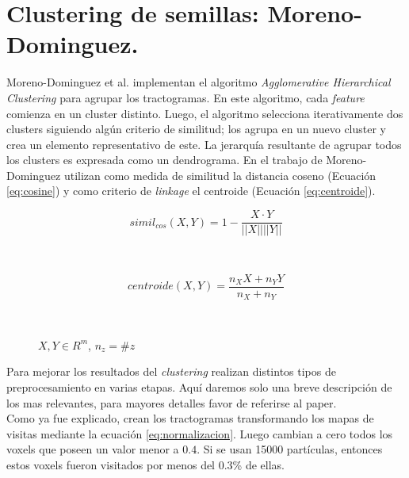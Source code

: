 \section{Clustering de semillas: Moreno-Dominguez.}

Moreno-Dominguez et al. \cite{Moreno-Dominguez2014} implementan el algoritmo
\textit{Agglomerative Hierarchical Clustering} para agrupar los tractogramas. 
En este algoritmo, cada \textit{feature} comienza en un cluster distinto. Luego,
el algoritmo selecciona iterativamente dos clusters siguiendo alg\'un criterio
de similitud; los agrupa en un nuevo cluster y crea un elemento representativo
de este. La jerarqu\'ia resultante de agrupar todos los clusters es expresada
como un dendrograma. En el trabajo de Moreno-Dominguez utilizan como medida de
similitud la distancia coseno (Ecuaci\'on \ref{eq:cosine}) y como criterio de
\textit{linkage} el centroide (Ecuaci\'on \ref{eq:centroide}).

\begin{figure}[h!]
                                                                                                                        
\begin{minipage}[b]{0.49\textwidth}
    \begin{equation}
        \label{eq:cosine}
        simil_{cos}(X,Y) = 1 - \frac{ X \cdot Y }{||X|| ||Y||}
    \end{equation}
\end{minipage} ~
\hfill
\begin{minipage}[b]{0.49\textwidth}
    \begin{equation}
        \label{eq:centroide}
        centroide(X,Y) = \frac{ n_X X + n_Y Y}{n_X + n_Y}
    \end{equation}
\end{minipage} ~

\centering
\vspace{0.5cm}
\small{$X, Y \in R^m$, $n_z = \#z$}

\end{figure}  

Para mejorar los resultados del \textit{clustering} realizan distintos tipos de
preprocesamiento en varias etapas. Aqu\'i daremos solo una breve descripci\'on 
de los mas relevantes, para mayores detalles favor de referirse al paper. \\

Como ya fue explicado, crean los tractogramas transformando los mapas de visitas 
mediante la ecuaci\'on \ref{eq:normalizacion}. Luego cambian a cero todos los voxels
que poseen un valor menor a $0.4$. Si se usan 15000 part\'iculas, entonces estos
voxels fueron visitados por menos del 0.3\% de ellas. \\

